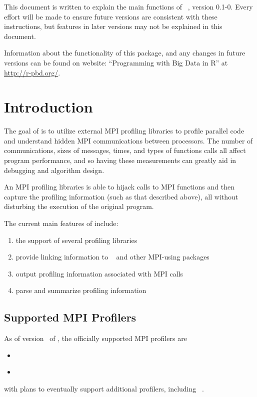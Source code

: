 This document is written to explain the main
functions of ~\citep{Chen2013pbdPROFpackage}, version 0.1-0.
Every effort will be made to ensure future versions are consistent with
these instructions, but features in later versions may not be explained
in this document.

Information about the functionality of this package,
and any changes in future versions can be found on website:
``Programming with Big Data in R'' at
\url{http://r-pbd.org/}.



\section{Introduction}
\label{sec:introduction}

The goal of  is to utilize external MPI profiling libraries
to profile parallel  code and understand hidden MPI
communications between processors. The number of communications,
sizes of messages, times, and types of functions calls all affect program
performance, and so having these measurements can greatly aid in debugging and 
algorithm design. 

An MPI profiling libraries is able to
hijack calls to MPI functions and then capture the profiling information 
(such as that described above), all without disturbing the execution of the original program.

The current main features of  include:
\begin{enumerate}
  \item the support of several profiling libraries
  \item provide linking information to ~\citep{pbdR2012} and other MPI-using  packages
  \item output profiling information associated with MPI calls
  \item parse and summarize profiling information
\end{enumerate}



\subsection{Supported MPI Profilers}

As of version \profversion\ of , the officially supported MPI profilers are
\begin{itemize}
  \item {}~\citep{fpmpi}
  \item {}~\citep{mpiP}
\end{itemize}
with plans to eventually support additional profilers, including ~\citep{TAU}.





